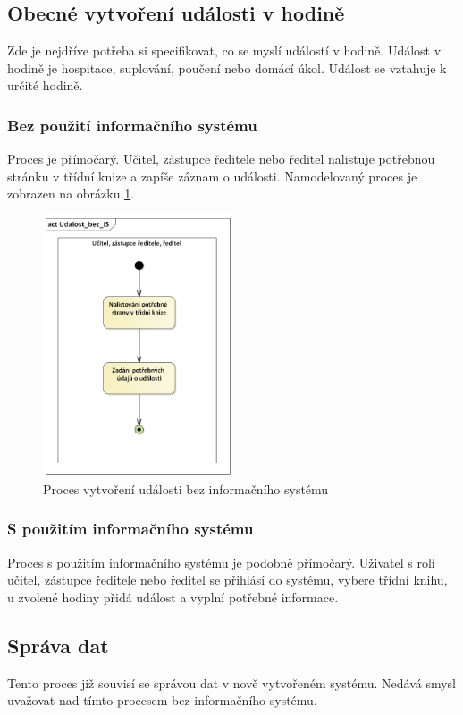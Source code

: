 \subsection{Obecné vytvoření události v hodině}
Zde je nejdříve potřeba si specifikovat, co se myslí událostí v hodině. Událost v hodině je hospitace, suplování, poučení nebo domácí úkol. Událost se vztahuje k určité hodině.
\subsubsection*{Bez použití informačního systému}
Proces je přímočarý. Učitel, zástupce ředitele nebo ředitel nalistuje potřebnou stránku v třídní knize a zapíše záznam o události. Namodelovaný proces je zobrazen na obrázku \ref{udalost_bez_IS}.
\clearpage

\begin{figure}[h]
	\centering
	\includegraphics[width=0.5\textwidth]{images/Udalost_bez_IS.png}
	\caption{Proces vytvoření události bez informačního systému}
	\label{udalost_bez_IS}
\end{figure}

\subsubsection*{S použitím informačního systému}
Proces s použitím informačního systému je podobně přímočarý. Uživatel s rolí učitel, zástupce ředitele nebo ředitel se přihlásí do systému, vybere třídní knihu, u zvolené hodiny přidá událost a vyplní potřebné informace.

\subsection{Správa dat}
Tento proces již souvisí se správou dat v nově vytvořeném systému. Nedává smysl uvažovat nad tímto procesem bez informačního systému.

